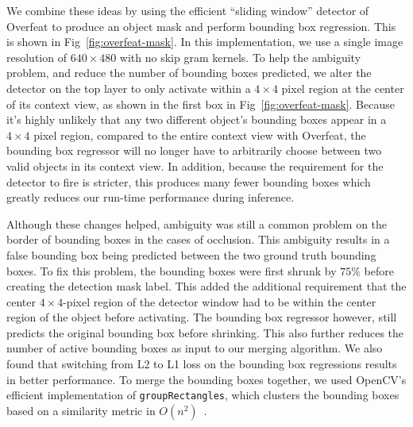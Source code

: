 \documentclass[journal]{IEEEtran}
\begin{document}
We combine these ideas by using the efficient ``sliding window'' detector of Overfeat to produce an object mask and perform bounding box regression. This is shown in Fig~\ref{fig:overfeat-mask}. In this implementation, we use a single image resolution of $640 \times 480$ with no skip gram kernels. To help the ambiguity problem, and reduce the number of bounding boxes predicted, we alter the detector on the top layer to only activate within a $4 \times 4$ pixel region at the center of its context view, as shown in the first box in Fig~\ref{fig:overfeat-mask}. Because it's highly unlikely that any two different object's bounding boxes appear in a $4 \times 4$ pixel region, compared to the entire context view with Overfeat, the bounding box regressor will no longer have to arbitrarily choose between two valid objects in its context view. In addition, because the requirement for the detector to fire is stricter, this produces many fewer bounding boxes which greatly reduces our run-time performance during inference.

Although these changes helped, ambiguity was still a common problem on the border of bounding boxes in the cases of occlusion. This ambiguity results in a false bounding box being predicted between the two ground truth bounding boxes. To fix this problem, the bounding boxes were first shrunk by $75\%$ before creating the detection mask label. This added the additional requirement that the center $4 \times 4$-pixel region of the detector window had to be within the center region of the object before activating. The bounding box regressor however, still predicts the original bounding box before shrinking. This also further reduces the number of active bounding boxes as input to our merging algorithm. We also found that switching from L2 to L1 loss on the bounding box regressions results in better performance. To merge the bounding boxes together, we used OpenCV's efficient implementation of \texttt{groupRectangles}, which clusters the bounding boxes based on a similarity metric in $O(n^2)$~\cite{opencv}.
\end{document}
